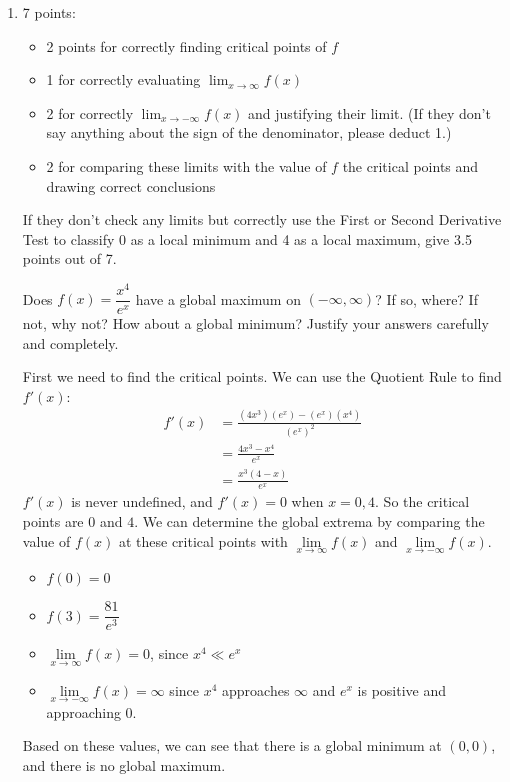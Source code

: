 \documentclass{article}
\begin{document}
\begin{enumerate}
\begin{enumerate}
  \end{enumerate}

\item 

  \begin{grading}
    7 points:
    \begin{itemize}[nosep]
    \item 2 points for correctly finding critical points of $f$
    \item 1 for correctly evaluating $\displaystyle \lim_{x \to \infty} f(x)$
    \item 2 for correctly $\displaystyle \lim_{x \to -\infty} f(x)$ and justifying their limit. (If they don't say anything about the sign of the denominator, please deduct 1.)
    \item 2 for comparing these limits with the value of $f$ the critical points and drawing correct conclusions
    \end{itemize}
    If they don't check any limits but correctly use the First or Second Derivative Test to classify 0 as a local minimum and 4 as a local maximum, give 3.5 points out of 7. 
  \end{grading}

  \begin{problem}[\newpage]
    Does $f(x) = \dfrac{x^4}{e^x}$ have a global maximum on $(-\infty, \infty)$? If so, where? If not, why not? How about a global minimum? Justify your answers carefully and completely. 
  \end{problem}

  \begin{solution}
    First we need to find the critical points.
    We can use the Quotient Rule
    to find $f'(x)$:
    \begin{align*} 
    f'(x) &= \frac{(4x^3)(e^x) - (e^x)(x^4)}{(e^x)^2} \\
    &= \frac{4x^3 - x^4}{e^x} \\
    &= \frac{x^3(4-x)}{e^x}
    \end{align*}
    $f'(x)$ is
    never undefined, and $f'(x)=0$ when $x = 0, 4$.  
    So the critical
    points are $0$ and $4$. 
    We can determine the global extrema by
    comparing the value of $f(x)$
    at these critical points with $\lim\limits_{x\to \infty} f(x)$
    and $\lim\limits_{x \to -\infty} f(x)$.
    \begin{itemize}
        \item $f(0)=0$
        \item $f(3)=\dfrac{81}{e^3}$
        \item $\lim\limits_{x\to \infty} f(x) = 0$, since $x^4 \ll e^x$
        \item $\lim\limits_{x \to -\infty} f(x) = \infty$ since $x^4$
        approaches $\infty$ and $e^{x}$ is positive and approaching $0$.
    \end{itemize}
    Based on these values, we can see that there is a global minimum
    at $(0, 0)$, and there is no global maximum.
  \end{solution}


\end{enumerate}
\end{document}

